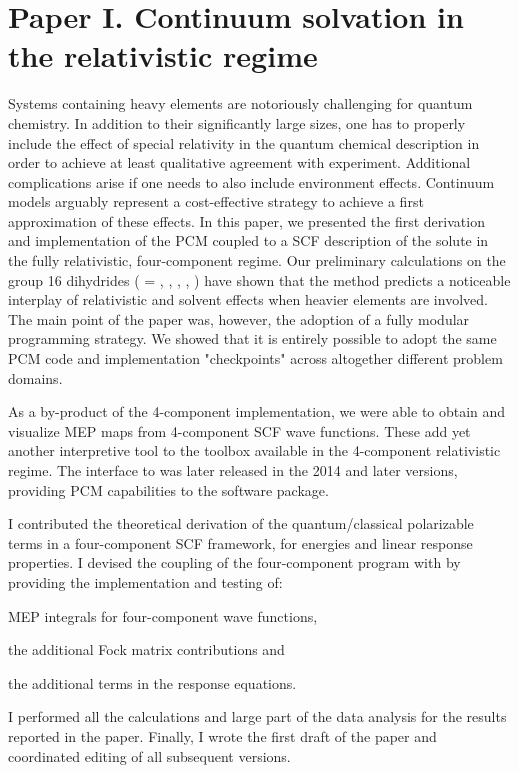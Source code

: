 \section*{Paper I. Continuum solvation in the relativistic regime}

Systems containing heavy elements are notoriously challenging for quantum chemistry.
In addition to their significantly large sizes, one has to properly include the
effect of special relativity in the quantum chemical description in order to
achieve at least qualitative agreement with experiment.
Additional complications arise if one needs to also include environment effects.
Continuum models arguably represent a cost-effective strategy to achieve a first
approximation of these effects.
In this paper, we presented the first derivation and implementation of the \acs{PCM}
coupled to a \acs{SCF} description of the solute in the fully relativistic, four-component
regime.
Our preliminary calculations on the group 16 dihydrides  ( =
, , , , ) have shown that the method predicts
a noticeable interplay of relativistic and solvent effects when heavier
elements are involved.
The main point of the paper was, however, the adoption of a fully modular
programming strategy. We showed that it is entirely possible to adopt the same
\acs{PCM} code and implementation "checkpoints" across altogether different
problem domains.

As a by-product of the 4-component implementation, we were able to obtain and visualize \acs{MEP} maps
from 4-component \acs{SCF} wave functions. These add yet another interpretive tool to the toolbox available
in the 4-component relativistic regime.
The interface to \DIRAC was later released in the 2014 and later versions,
providing \acs{PCM} capabilities to the software package.

I contributed the theoretical derivation of the quantum/classical polarizable
terms in a four-component \acs{SCF} framework, for energies and linear response
properties. I devised the coupling of the four-component program \DIRAC with
\pcmsolver by providing the implementation and testing of:
\begin{enumerate*}[label={\alph*)},font={\color{PMS1797}}]
  \item \acs{MEP} integrals for four-component wave functions,
  \item the additional Fock matrix contributions and
  \item the additional terms in the response equations.
\end{enumerate*}
I performed all the calculations and large part of the data analysis
for the results reported in the paper.
Finally, I wrote the first draft of the paper and coordinated editing of
all subsequent versions.


